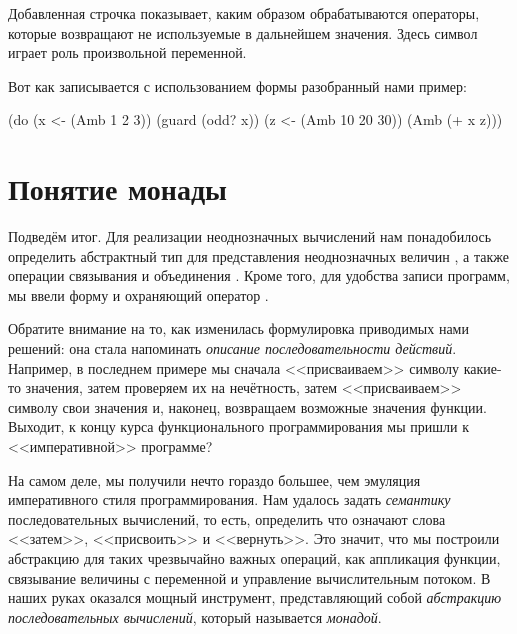 Добавленная строчка показывает, каким образом обрабатываются операторы, которые возвращают не используемые в дальнейшем значения. Здесь символ \s{_} играет роль произвольной переменной.

Вот как записывается с использованием формы  разобранный нами пример:

\begin{SchemeCode}
(do (x <- (Amb 1 2 3))
    (guard (odd? x))
    (z <- (Amb 10 20 30))
    (Amb (+ x z)))
\end{SchemeCode}


\section[2]{Понятие монады}%
Подведём итог. Для реализации неоднозначных вычислений нам понадобилось определить абстрактный тип для представления неоднозначных величин , а также операции связывания  и объединения . Кроме того, для удобства записи программ, мы ввели форму  и охраняющий оператор .

Обратите внимание на то, как изменилась формулировка приводимых нами решений: она стала напоминать \emph{описание последовательности действий}. 
Например, в последнем примере мы сначала <<присваиваем>> символу  какие-то значения, затем проверяем их на нечётность, затем <<присваиваем>> символу  свои значения и, наконец, возвращаем возможные значения функции. Выходит, к концу курса функционального программирования мы  пришли к <<императивной>> программе? 

На самом деле, мы получили нечто гораздо большее, чем эмуляция императивного стиля программирования. Нам удалось задать \emph{семантику} последовательных вычислений, то есть, определить что означают слова <<затем>>, <<присвоить>> и <<вернуть>>. Это значит, что мы построили абстракцию для таких чрезвычайно важных операций, как  аппликация функции, связывание величины с переменной и управление вычислительным потоком. В наших руках оказался мощный инструмент, представляющий собой \emph{абстракцию последовательных вычислений}, который называется \emph{монадой}. 

